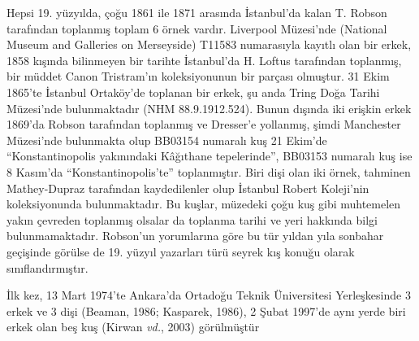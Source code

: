 \documentclass[
  10.5pt,
  a4paper,
  DIV=11,
  numbers=noendperiod,
  twocolumn]{scrreprt}
\begin{document}
Hepsi 19. yüzyılda, çoğu 1861 ile 1871 arasında İstanbul'da kalan T.
Robson tarafından toplanmış toplam 6 örnek vardır. Liverpool Müzesi'nde
(National Museum and Galleries on Merseyside) T11583 numarasıyla kayıtlı
olan bir erkek, 1858 kışında bilinmeyen bir tarihte İstanbul'da H.
Loftus tarafından toplanmış, bir müddet Canon Tristram'ın koleksiyonunun
bir parçası olmuştur. 31 Ekim 1865'te İstanbul Ortaköy'de toplanan bir
erkek, şu anda Tring Doğa Tarihi Müzesi'nde bulunmaktadır (NHM
88.9.1912.524). Bunun dışında iki erişkin erkek 1869'da Robson
tarafından toplanmış ve Dresser'e yollanmış, şimdi Manchester Müzesi'nde
bulunmakta olup BB03154 numaralı kuş 21 Ekim'de ``Konstantinopolis
yakınındaki Kâğıthane tepelerinde'', BB03153 numaralı kuş ise 8 Kasım'da
``Konstantinopolis'te'' toplanmıştır. Biri dişi olan iki örnek, tahminen
Mathey-Dupraz tarafından kaydedilenler olup İstanbul Robert Koleji'nin
koleksiyonunda bulunmaktadır. Bu kuşlar, müzedeki çoğu kuş gibi
muhtemelen yakın çevreden toplanmış olsalar da toplanma tarihi ve yeri
hakkında bilgi bulunmamaktadır. Robson'un yorumlarına göre bu tür yıldan
yıla sonbahar geçişinde görülse de 19. yüzyıl yazarları türü seyrek kış
konuğu olarak sınıflandırmıştır.

İlk kez, 13 Mart 1974'te Ankara'da Ortadoğu Teknik Üniversitesi
Yerleşkesinde 3 erkek ve 3 dişi (Beaman, 1986; Kasparek, 1986), 2 Şubat
1997'de aynı yerde biri erkek olan beş kuş (Kirwan \emph{vd.}, 2003)
görülmüştür
\end{document}
